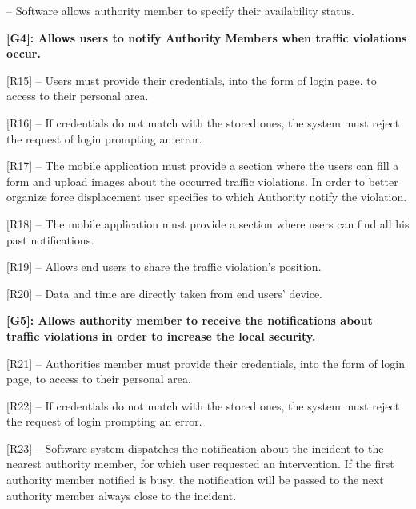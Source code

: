 \documentclass[12pt]{article}
\begin{document}
\begin{flushleft}
[R14] – Software allows authority member to specify their availability status.
\vspace{2mm}

\vspace{4mm}
\textbf{[G4]: Allows users to notify Authority Members when traffic violations occur.}
\vspace{2mm}

[R15] -- Users must provide their credentials, into the form of login page, to access to their personal area.
\vspace{2mm}

[R16] – If credentials do not match with the stored ones, the system must reject the request of login prompting an error.
\vspace{2mm}

[R17] – The mobile application must provide a section where the users can fill a form and upload images about the occurred traffic violations. In order to better organize force displacement user specifies to which Authority notify the violation.
\vspace{2mm}

[R18] –  The mobile application must provide a section where users can find all his past notifications.
\vspace{2mm}

[R19] – Allows end users to share the traffic violation’s position.
\vspace{2mm}

[R20] – Data and time are directly taken from end users’ device.
\vspace{2mm}

\vspace{4mm}
\textbf{[G5]: Allows authority member to receive the notifications about traffic violations in order to increase the local security.}
\vspace{2mm}

[R21] -- Authorities member must provide their credentials, into the form of login page, to access to their personal area.
\vspace{2mm}

[R22] – If credentials do not match with the stored ones, the system must reject the request of login prompting an error.
\vspace{2mm}

[R23] – Software system dispatches the notification about the incident to the nearest authority member, for which user requested an intervention. If the first authority member notified is busy, the notification will be passed to the next authority member always close to the incident.
\vspace{2mm}


\end{flushleft}
\end{document}
